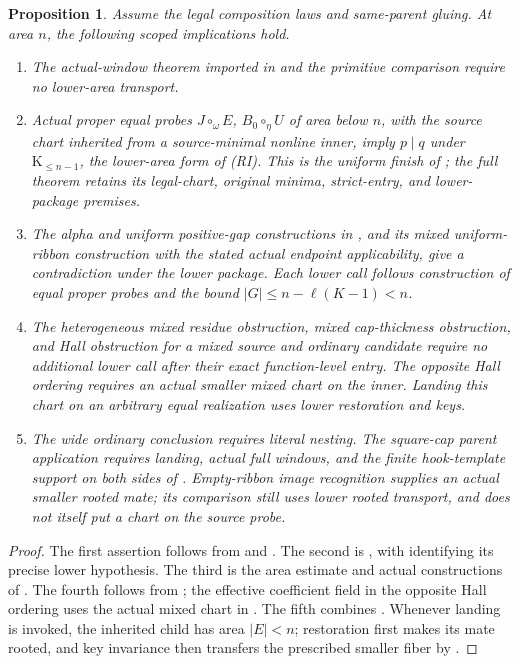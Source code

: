 \documentclass[11pt,a4paper]{amsart}
\numberwithin{equation}{section}
\theoremstyle{plain}
\newtheorem{proposition}[theorem]{Proposition}
\theoremstyle{definition}
\begin{document}
\begin{proposition}\label{prop:conditional-coverage}
Assume the legal composition laws and same-parent gluing.  At area \(n\), the following scoped implications hold.
\begin{enumerate}
\item The actual-window theorem imported in  and the primitive comparison  require no lower-area transport.
\item Actual proper equal probes \(J\circ_\omega E\), \(B_0\circ_\eta U\) of area below \(n\), with the source chart inherited from a source-minimal nonline inner, imply \(p\mid q\) under \(\mathrm K_{\le n-1}\), the lower-area form of (RI).  This is the uniform finish of ; the full theorem retains its legal-chart, original minima, strict-entry, and lower-package premises.
\item The alpha and uniform positive-gap constructions in , and its mixed uniform-ribbon construction with the stated actual endpoint applicability, give a contradiction under the lower package.  Each lower call follows construction of equal proper probes and the bound \(|G|\le n-\ell(K-1)<n\).
\item The heterogeneous mixed residue obstruction, mixed cap-thickness obstruction, and Hall obstruction for a mixed source and ordinary candidate require no additional lower call after their exact function-level entry.  The opposite Hall ordering requires an actual smaller mixed chart on the inner.  Landing this chart on an arbitrary equal realization uses lower restoration and keys.
\item The wide ordinary conclusion requires literal nesting.  The square-cap parent application requires landing, actual full windows, and the finite hook-template support on both sides of .  Empty-ribbon image recognition supplies an actual smaller rooted mate; its comparison still uses lower rooted transport, and does not itself put a chart on the source probe.
\end{enumerate}
\end{proposition}
\begin{proof}
The first assertion follows from \cite{Shields2026CornerDescent} and .  The second is , with  identifying its precise lower hypothesis.  The third is the area estimate and actual constructions of .  The fourth follows from ; the effective coefficient field in the opposite Hall ordering uses the actual mixed chart in .  The fifth combines .  Whenever landing is invoked, the inherited child has area \(|E|<n\); restoration first makes its mate rooted, and key invariance then transfers the prescribed smaller fiber by .
\end{proof}
\end{document}
